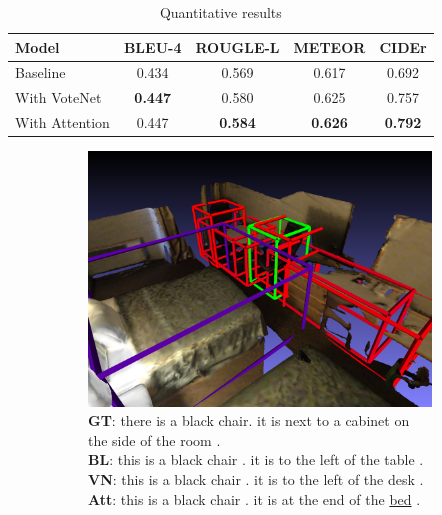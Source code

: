 \documentclass[10pt,twocolumn,letterpaper]{article}
\begin{document}
\begin{table}
	\centering
	\begin{tabular}{l|cccc}
		\textbf{Model} & \textbf{BLEU-4} & \textbf{ROUGLE-L} & \textbf{METEOR} & \textbf{CIDEr}\\
		\hline
		Baseline & 0.434 & 0.569 & 0.617 & 0.692 \\
		With VoteNet & \textbf{0.447} & 0.580 & 0.625 & 0.757 \\
		With Attention & 0.447 & \textbf{0.584} & \textbf{0.626} & \textbf{0.792}  
	\end{tabular}
	\caption{Quantitative results}
	\label{tab:quantitative_results}
\end{table}

\begin{figure}
	\centering
	\begin{subfigure}[c]{.45\textwidth}
		\centering
		\includegraphics[width=\textwidth]{figures/gt_scene0221_00_3_0_att_02.png}
		\caption{
			\textbf{GT}: there is a black chair. it is next to a cabinet on the side of the room .\\
			\textbf{BL}: this is a black chair . it is to the left of the table .\\
			\textbf{VN}: this is a black chair . it is to the left of the desk .\\
			\textbf{Att}: this is a black chair . it is at the end of the \underline{bed} .}
		\label{fig:example_1}
	\end{subfigure}
	\begin{subfigure}[c]{.45\textwidth}
		\centering

\end{subfigure}
\end{figure}
\end{document}

